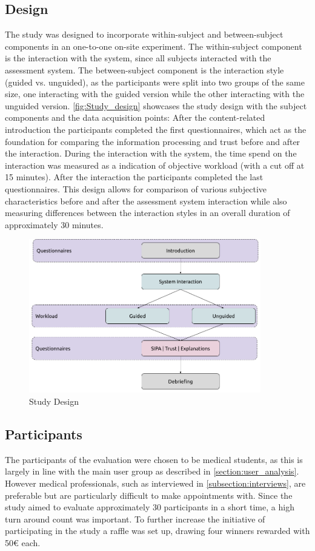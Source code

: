 \documentclass[11pt,a4paper,english]{scrreprt}
\begin{document}
\subsection{Design}
The study was designed to incorporate within-subject and between-subject components in an one-to-one on-site experiment. The within-subject component is the interaction with the system, since all subjects interacted with the assessment system. The between-subject component is the interaction style (guided vs. unguided), as the participants were split into two groups of the same size, one interacting with the guided version while the other interacting with the unguided version. \autoref{fig:Study_design} showcases the study design with the subject components and the data acquisition points: After the content-related introduction the participants completed the first questionnaires, which act as the foundation for comparing the information processing and trust before and after the interaction. During the interaction with the system, the time spend on the interaction was measured as a indication of objective workload (with a cut off at 15 minutes). After the interaction the participants completed the last questionnaires. This design allows for comparison of various subjective characteristics before and after the assessment system interaction while also measuring differences between the interaction styles in an overall duration of approximately 30 minutes.

\begin{figure}[htbp]
    \centering
    \includegraphics[width=0.9\textwidth]{img/study_design.png}
    \caption{Study Design}
    \label{fig:Study_design}
\end{figure}

\subsection{Participants}
The participants of the evaluation were chosen to be medical students, as this is largely in line with the main user group as described in \autoref{section:user_analysis}. However medical professionals, such as interviewed in \autoref{subsection:interviews}, are preferable but are particularly difficult to make appointments with. Since the study aimed to evaluate approximately 30 participants in a short time, a high turn around count was important. To further increase the initiative of participating in the study a raffle was set up, drawing four winners rewarded with 50€ each.
\end{document}
